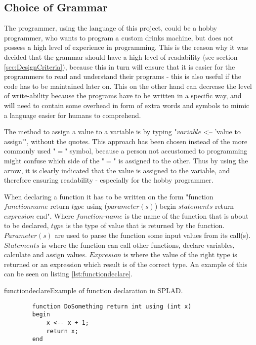 \subsection{Choice of Grammar}
\label{sec:grammarchoice}
The programmer, using the language of this project, could be a hobby programmer, who wants to program a custom drinks machine, but does not possess a high level of experience in programming. This is the reason why it was decided that the grammar should have a high level of readability (see section \ref{sec:DesignCriteria}), because this in turn will ensure that it is easier for the programmers to read and understand their programs - this is also useful if the code has to be maintained later on. This on the other hand can decrease the level of write-ability because the programs have to be written in a specific way, and will need to contain some overhead in form of extra words and symbols to mimic a language easier for humans to comprehend.

The method to assign a value to a variable is by typing "$variable$ <-- 'value to assign'", without the quotes. This approach has been chosen instead of the more commonly used "$=$" symbol, because a person not accustomed to programming might confuse which side of the "$=$" is assigned to the other. Thus by using the arrow, it is clearly indicated that the value is assigned to the variable, and therefore ensuring readability - especially for the hobby programmer.

When declaring a function it has to be written on the form "function $functionname$ return $type$ using ($parameter(s)$) begin $statements$ return $expresion$ end". Where $function$-$name$ is the name of the function that is about to be declared, $type$ is the type of value that is returned by the function. $Parameter(s)$ are used to parse the function some input values from its call(s). $Statements$ is where the function can call other functions, declare variables, calculate and assign values. $Expresion$ is where the value of the right type is returned or an expression which result is of the correct type.
An example of this can be seen on listing \ref{lst:functiondeclare}.

\begin{code}{functiondeclare}{Example of function declaration in SPLAD.}
	\begin{lstlisting}
		function DoSomething return int using (int x)
		begin
			x <-- x + 1;
			return x;
		end
	\end{lstlisting}
\end{code}


